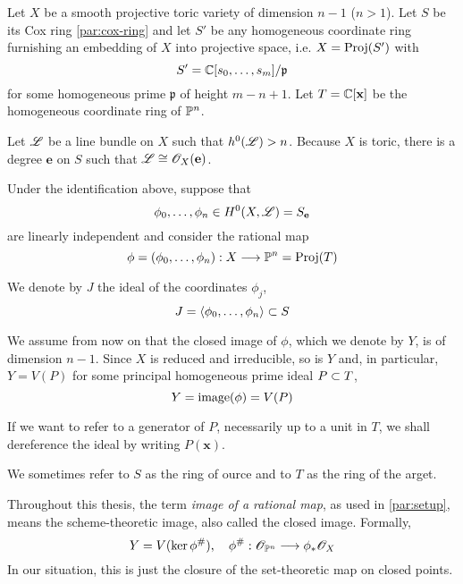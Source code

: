 \documentclass[fleqn,reqno]{amsart}
\begin{document}
\begin{paragraf}
\label{par:setup}
Let $X$ be a smooth projective toric variety of dimension $n-1$ ($n>1$).
Let $S$ be its Cox ring \eqref{par:cox-ring} and
let $S'$ be any homogeneous coordinate ring
furnishing an embedding of $X$ into projective space, i.e. $X=\operatorname{Proj}(S')$ with
\[
	S'=\mathbb{C}[s_0,\ldots,s_m]/\mathfrak{p}
\]
for some homogeneous prime $\mathfrak{p}$ of height $m-n+1$.
Let $T=\mathbb{C}[\mathbf x]$ be the homogeneous coordinate ring of $\mathbb{P}^n$.

Let $\mathscr{L}$ be a line bundle on $X$ such that $h^0(\mathscr{L})> n$.
Because $X$ is toric,
there is a degree $\mathbf e$ on $S$ such that $\mathscr{L}\cong\mathscr{O}_X(\mathbf e)$.

Under the identification above, suppose that
\[
\phi_0,\ldots,\phi_n\in H^0(X,\mathscr{L})=S_{\mathbf e}
\]
are linearly independent and consider the rational map
\[
	\phi=(\phi_0,\ldots,\phi_n):X\longrightarrow\mathbb{P}^n=\operatorname{Proj}(T)
\]

We denote by $J$ the ideal of the coordinates $\phi_j$,
\[
	J=\langle\phi_0,\ldots,\phi_n\rangle\subset S
\]

We assume from now on that the closed image of $\phi$, which we denote by $Y$,
is of dimension $n-1$.
Since $X$ is reduced and irreducible, so is $Y$ and, in particular,
$Y=V(P)$ for some principal homogeneous prime ideal $P\subset T$,
\[
	Y=\operatorname{image}(\phi)=V(P)
\]

If we want to refer to a generator of $P$, necessarily up to a unit in $T$,
we shall dereference the ideal by writing $P(\mathbf x)$.

We sometimes refer to $S$ as the ring of ource and
to $T$ as the ring of the arget.
\end{paragraf}

\begin{paragraf}
Throughout this thesis, the term {\em image of a rational map}, as used in \eqref{par:setup},
means the scheme-theoretic image, also called the closed image. Formally,
\[
	Y = V(\ker\phi^\#),\quad \phi^\#:\mathscr{O}_{\mathbb{P}^n}\longrightarrow\phi_\ast\mathscr{O}_X
\]
In our situation, this is just the closure of the set-theoretic map on closed points.
\end{paragraf}
\end{document}
